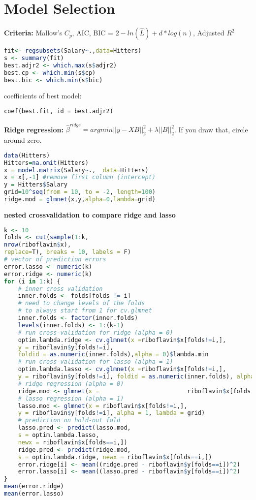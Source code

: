 \section{Model Selection}
\textbf{Criteria: } Mallow's $C_p$, AIC, BIC = $2-ln(\hat L) + d*log(n)$, Adjusted $R^2$
\begin{lstlisting}[language =R]
fit<- regsubsets(Salary~.,data=Hitters)
s <- summary(fit)
best.adjr2 <- which.max(s$adjr2)
best.cp <- which.min(s$cp)
best.bic <- which.min(s$bic)
\end{lstlisting}
coefficients of best model:
\begin{lstlisting}
coef(best.fit, id = best.adjr2)
\end{lstlisting}
\textbf{Ridge regression: } $\hat\beta^{ridge} = argmin ||y-XB||_2^2+ \lambda||B||_2^2$. If you draw that, circle around zero. 
\begin{lstlisting}[language=R]
data(Hitters)
Hitters=na.omit(Hitters)
x = model.matrix(Salary~.,  data=Hitters)
x = x[,-1] #remove first column (intercept)
y = Hitters$Salary
grid=10^seq(from = 10, to = -2, length=100)
ridge.mod = glmnet(x,y,alpha=0,lambda=grid)
\end{lstlisting}
\textbf{nested crossvalidation to compare ridge and lasso}
\begin{lstlisting}[language =R]
k <- 10
folds <- cut(sample(1:k,
nrow(riboflavin$x),
replace=T), breaks = 10, labels = F)
# vector of prediction errors
error.lasso <- numeric(k)
error.ridge <- numeric(k)
for (i in 1:k) {
	# inner cross validation
	inner.folds <- folds[folds != i]
	# need to change levels of the folds
	# to always start from 1 for cv.glmnet
	inner.folds <- factor(inner.folds)
	levels(inner.folds) <- 1:(k-1)
	# run cross-validation for ridge (alpha = 0)
	optim.lambda.ridge <- cv.glmnet(x =riboflavin$x[folds!=i,],
	y = riboflavin$y[folds!=i],
	foldid = as.numeric(inner.folds),alpha = 0)$lambda.min
	# run cross-validation for lasso (alpha = 1)
	optim.lambda.lasso <- cv.glmnet(x =riboflavin$x[folds!=i,],
	y = riboflavin$y[folds!=i], foldid = as.numeric(inner.folds), alpha = 1)$lambda.min
	# ridge regression (alpha = 0)
	ridge.mod <- glmnet(x = 						riboflavin$x[folds!=i,], y = riboflavin$y[folds!=i], alpha = 0, lambda = grid)
	# lasso regression (alpha = 1)
	lasso.mod <- glmnet(x = riboflavin$x[folds!=i,],
	y = riboflavin$y[folds!=i], alpha = 1, lambda = grid)
	# prediction on hold-out fold
	lasso.pred <- predict(lasso.mod,
	s = optim.lambda.lasso,
	newx = riboflavin$x[folds==i,])
	ridge.pred <- predict(ridge.mod,
	s = optim.lambda.ridge, newx = riboflavin$x[folds==i,])
	error.ridge[i] <- mean((ridge.pred - riboflavin$y[folds==i])^2)
	error.lasso[i] <- mean((lasso.pred - riboflavin$y[folds==i])^2)
}
mean(error.ridge)
mean(error.lasso)
\end{lstlisting}
